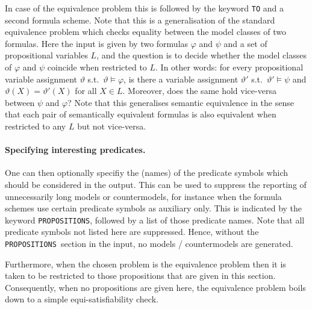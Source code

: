 \documentclass[twoside]{article}
\begin{document}
In case of the equivalence problem this is followed by the keyword \texttt{TO} and a second formula scheme. Note that this is a generalisation
of the standard equivalence problem which checks equality between the model classes of two formulas. Here the input is given by two formulas
$\varphi$ and $\psi$ and a set of propositional variables $L$, and the question is to decide whether the model classes of $\varphi$ and $\psi$
coincide when restricted to $L$. In other words: for every propositional variable assignment $\vartheta$ s.t.\ $\vartheta \models \varphi$, is
there a variable assignment $\vartheta'$ s.t.\ $\vartheta' \models \psi$ and $\vartheta(X) = \vartheta'(X)$ for all $X \in L$. Moreover, does
the same hold vice-versa between $\psi$ and $\varphi$? Note that this generalises semantic equivalence in the sense that each pair of
semantically equivalent formulas is also equivalent when restricted to any $L$ but not vice-versa.
 

\paragraph*{Specifying interesting predicates.}
One can then optionally specifiy the (names) of the predicate symbols which should be considered in the output. This can be used
to suppress the reporting of unnecessarily long models or countermodels, for instance when the formula schemes use certain predicate
symbols as auxiliary only. This is indicated by the keyword \texttt{PROPOSITIONS}, followed by a list of those predicate names. Note
that all predicate symbols not listed here are suppressed. Hence, without the \texttt{PROPOSITIONS} section in the input, no models / 
countermodels are generated.

Furthermore, when the chosen problem is the equivalence problem then it is taken to be restricted to those propositions that are given 
in this section. Consequently, when no propositions are given here, the equivalence problem boils down to a simple equi-satisfiability check.
\end{document}
